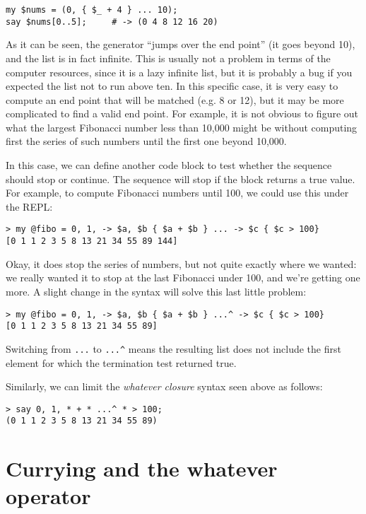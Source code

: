 \begin{verbatim}
my $nums = (0, { $_ + 4 } ... 10);
say $nums[0..5];     # -> (0 4 8 12 16 20)
\end{verbatim}

As it can be seen, the generator ``jumps over the end 
point'' (it goes beyond 10), and the list is 
in fact infinite. This is usually not a problem 
in terms of the computer resources, since it is 
a lazy infinite list, but it is probably a bug if 
you expected the list not to run above ten. In this 
specific case, it is very easy to compute an end 
point that will be matched (e.g. 8 or 12), but it may be 
more complicated to find a valid end point. For example, 
it is not obvious to figure out what the largest 
Fibonacci number less than 10,000 might be without 
computing first the series of such numbers until the 
first one beyond 10,000.

In this case, we can define another code block to test 
whether the sequence should stop or continue. The sequence 
will stop if the block returns a true value. For example, 
to compute Fibonacci numbers until 100, we could use this 
under the REPL:

\begin{verbatim}
> my @fibo = 0, 1, -> $a, $b { $a + $b } ... -> $c { $c > 100}
[0 1 1 2 3 5 8 13 21 34 55 89 144]
\end{verbatim}

Okay, it does stop the series of numbers, but not quite exactly 
where we wanted: we really wanted it to stop at the last 
Fibonacci under 100, and we're getting one more. A slight 
change in the syntax will solve this last little problem:

\begin{verbatim}
> my @fibo = 0, 1, -> $a, $b { $a + $b } ...^ -> $c { $c > 100}
[0 1 1 2 3 5 8 13 21 34 55 89]
\end{verbatim}

Switching from \verb'...' to \verb'...^' means the 
resulting list does not include the first element 
for which the termination test returned true.

Similarly, we can limit the \emph{whatever closure} 
syntax seen above as follows:

\begin{verbatim}
> say 0, 1, * + * ...^ * > 100;
(0 1 1 2 3 5 8 13 21 34 55 89)
\end{verbatim}

\section{Currying and the whatever operator}

